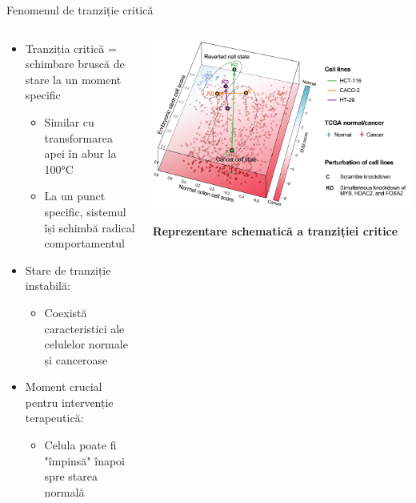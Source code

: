 \documentclass{beamer}
\begin{document}
	\begin{frame}{Fenomenul de tranziție critică}
		\begin{columns}
			\begin{column}{0.5\textwidth}
				\begin{itemize}
					\item Tranziția critică = schimbare bruscă de stare la un moment specific
					\begin{itemize}
						\item Similar cu transformarea apei în abur la 100°C
						\item La un punct specific, sistemul își schimbă radical comportamentul
					\end{itemize}
					\item Stare de tranziție instabilă:
					\begin{itemize}
						\item Coexistă caracteristici ale celulelor normale și canceroase
					\end{itemize}
					\item Moment crucial pentru intervenție terapeutică:
					\begin{itemize}
						\item Celula poate fi "împinsă" înapoi spre starea normală
					\end{itemize}
				\end{itemize}
			\end{column}
			\begin{column}{0.5\textwidth}
				\begin{center}
					\includegraphics[width=\textwidth]{image1.png}
					
					\textbf{Reprezentare schematică a tranziției critice}
				\end{center}
			\end{column}
		\end{columns}
	\end{frame}
	
\end{document}
